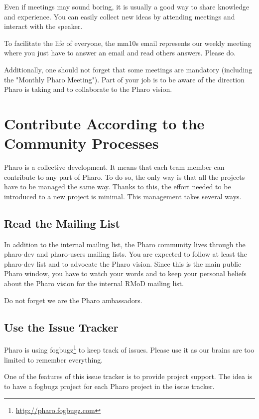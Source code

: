 \documentclass[10pt]{article}
\begin{document}
Even if meetings may sound boring, it is usually a good way to share knowledge and experience.
You can easily collect new ideas by attending meetings and interact with the speaker.

To facilitate the life of everyone, the mm10s email represents our
weekly meeting where you just have to answer an email and read others
answers. Please do.

Additionally, one should not forget that some meetings are mandatory (including the "Monthly Pharo Meeting").
Part of your job is to be aware of the direction Pharo is taking and to collaborate to the Pharo vision.

\section{Contribute According to the Community Processes}


Pharo is a collective development. It means that each team member can contribute to any part of Pharo.
To do so, the only way is that all the projects have to be managed the same way.
Thanks to this, the effort needed to be introduced to a new project is minimal.
This management takes several ways.

\subsection{Read the Mailing List}

In addition to the internal mailing list, the Pharo community lives through the pharo-dev and pharo-users mailing lists. You are expected to follow at least the pharo-dev list and to advocate the Pharo vision. Since this is the main public Pharo window, you have to watch your words and to keep your personal beliefs about the Pharo vision for the internal RMoD mailing list.

Do not forget we are the Pharo ambassadors.

\subsection{Use the Issue Tracker}

Pharo is using fogbugz\footnote{\url{http://pharo.fogbugz.com}} to keep track of issues. Please use it as our brains are too limited to remember everything.

One of the features of this issue tracker is to provide project support. The idea is to have a fogbugz project for each Pharo project  in the issue tracker.
\end{document}
